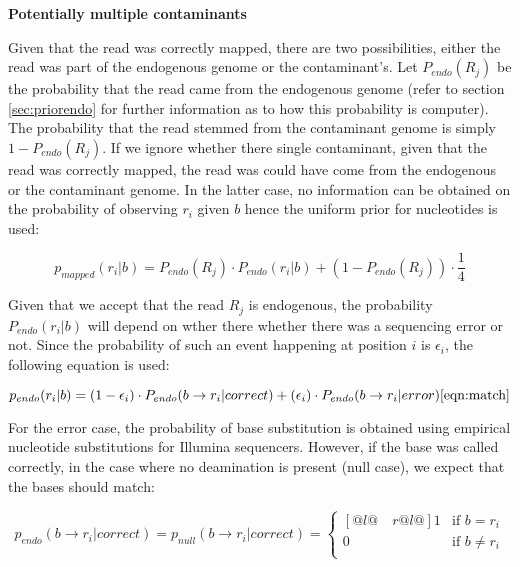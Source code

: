 \documentclass[a4paper,12pt]{article}
\begin{document}

{\bf Potentially multiple contaminants}


Given that the read was correctly mapped, there are two possibilities, either the read was part of the endogenous genome or the contaminant's. Let $P_{endo}(R_j)$ be the probability that the read came from the endogenous genome (refer to section \ref{sec:priorendo} for further information as to how this probability is computer). The probability that the read stemmed from the contaminant genome is simply $1-P_{endo}(R_j)$. If we ignore whether there single contaminant, given that the read was correctly mapped, the read was could have come from the endogenous or the contaminant genome. In the latter case, no information can be obtained on the probability of observing $r_i$ given $b$ hence the uniform prior for nucleotides is used:

\begin{equation}
p_{mapped}(r_i|b) =  P_{endo}(R_j) \cdot P_{endo} (r_i|b)   + (1-P_{endo}(R_j)) \cdot \frac {1} {4}
\label{eqn:correctmap}
\end{equation}

\noindent Given that we accept that the read $R_j$ is endogenous, the probability $P_{endo} (r_i|b)$ will depend on wther there whether there was a sequencing error or not. Since the probability of such an event happening at position $i$ is $\epsilon_i$, the following equation is used:

\begin{equation}
  p_{endo}(r_i|b)   =  (1-\epsilon_i ) \cdot  P_{endo}( b \to r_i|correct) +  (\epsilon_i) \cdot P_{endo}(  b \to r_i |error)   
\ref{eqn:match}
\end{equation} 

\noindent For the error case, the probability of base substitution is obtained using empirical nucleotide substitutions for Illumina sequencers. However, if the base was called correctly, in the case where no deamination is present (null case), we expect that the bases should match:

\begin{equation}
p_{endo}(b \to r_i | correct) =   p_{null}(b \to r_i | correct)   = \begin{cases}[@{}l@{\quad}r@{}l@{}]
    1  &  \text{if }  b = r_i    \\
    0 &  \text{if }  b \ne r_i    \\
  \end{cases}
\label{eqn:nullmatch}
\end{equation} 
\end{document}
